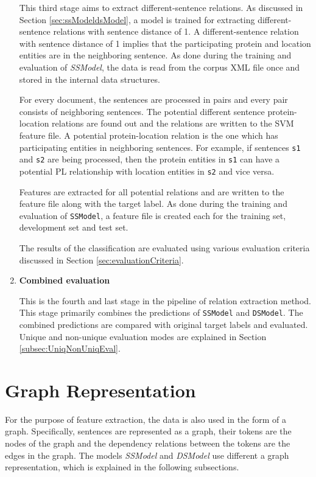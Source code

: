 \begin{enumerate}
This third stage aims to extract different-sentence relations. As discussed in Section \ref{sec:ssModeldsModel}, a model is trained for extracting different-sentence relations with sentence distance of 1. A different-sentence relation with sentence distance of 1 implies that the participating protein and location entities are in the neighboring sentence. As done during the training and evaluation of \textit{SSModel}, the data is read from the corpus XML file once and stored in the internal data structures.

For every document, the sentences are processed in pairs and every pair consists of neighboring sentences. The potential different sentence protein-location relations are found out and the relations are written to the SVM feature file. A potential protein-location relation is the one which has participating entities in neighboring sentences. For example, if sentences \texttt{s1} and \texttt{s2} are being processed, then the protein entities in \texttt{s1} can have a potential PL relationship with location entities in \texttt{s2} and vice versa.

Features are extracted for all potential relations and are written to the feature file along with the target label. As done during the training and evaluation of \texttt{SSModel}, a feature file is created each for the training set, development set and test set.

The results of the classification are evaluated using various evaluation criteria discussed in Section \ref{sec:evaluationCriteria}.

\item \textbf{Combined evaluation}

This is the fourth and last stage in the pipeline of relation extraction method. This stage primarily combines the predictions of \texttt{SSModel} and \texttt{DSModel}. The combined predictions are compared with original target labels and evaluated. Unique and non-unique evaluation modes are explained in Section \ref{subsec:UniqNonUniqEval}.

\end{enumerate}

\section{Graph Representation} \label{sec:graphRep}

For the purpose of feature extraction, the data is also used in the form of a graph. Specifically, sentences are represented as a graph, their tokens are the nodes of the graph and the dependency relations between the tokens are the edges in the graph. The models \textit{SSModel} and \textit{DSModel} use different a graph representation, which is explained in the following subsections.

